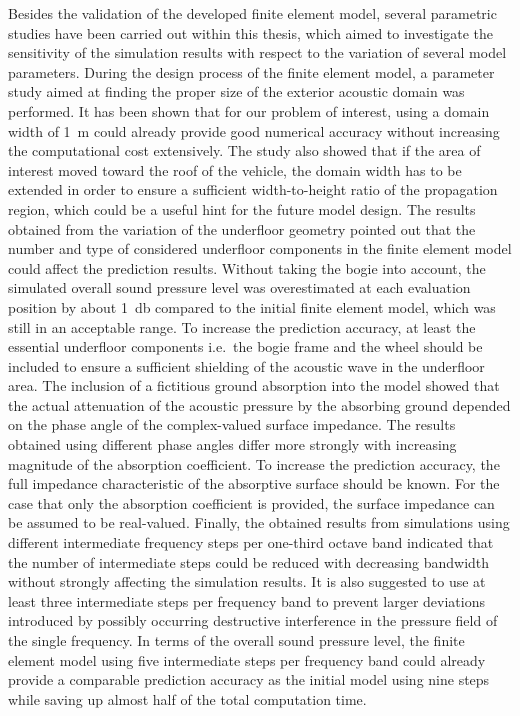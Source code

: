 Besides the validation of the developed finite element model, several parametric studies have been carried out within this thesis, which aimed to investigate the sensitivity of the simulation results with respect to the variation of several model parameters.
During the design process of the finite element model, a parameter study aimed at finding the proper size of the exterior acoustic domain was performed. It has been shown that for our problem of interest, using a domain width of \SI{1}{\meter} could already provide good numerical accuracy without increasing the computational cost extensively. The study also showed that if the area of interest moved toward the roof of the vehicle, the domain width has to be extended in order to ensure a sufficient width-to-height ratio of the propagation region, which could be a useful hint for the future model design.
The results obtained from the variation of the underfloor geometry pointed out that the number and type of considered underfloor components in the finite element model could affect the prediction results. Without taking the bogie into account, the simulated overall sound pressure level was overestimated at each evaluation position by about \SI{1}{\decibel} compared to the initial finite element model, which was still in an acceptable range. To increase the prediction accuracy, at least the essential underfloor components i.e.\ the bogie frame and the wheel should be included to ensure a sufficient shielding of the acoustic wave in the underfloor area.
The inclusion of a fictitious ground absorption into the model showed that the actual attenuation of the acoustic pressure by the absorbing ground depended on the phase angle of the complex-valued surface impedance. The results obtained using different phase angles differ more strongly with increasing magnitude of the absorption coefficient. To increase the prediction accuracy, the full impedance characteristic of the absorptive surface should be known. For the case that only the absorption coefficient is provided, the surface impedance can be assumed to be real-valued.
Finally, the obtained results from simulations using different intermediate frequency steps per one-third octave band indicated that the number of intermediate steps could be reduced with decreasing bandwidth without strongly affecting the simulation results. It is also suggested to use at least three intermediate steps per frequency band to prevent larger deviations introduced by possibly occurring destructive interference in the pressure field of the single frequency. In terms of the overall sound pressure level, the finite element model using five intermediate steps per frequency band could already provide a comparable prediction accuracy as the initial model using nine steps while saving up almost half of the total computation time.

